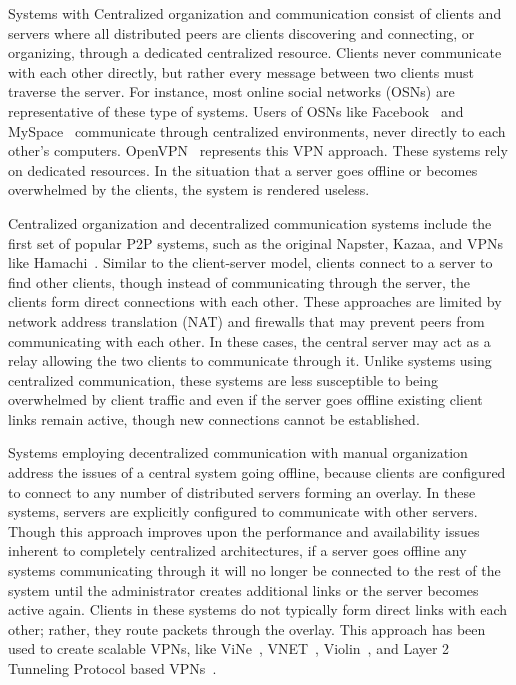 Systems with Centralized organization and communication consist of clients and
servers where all distributed peers are clients discovering and connecting, or
organizing, through a dedicated centralized resource. Clients never communicate
with each other directly, but rather every message between two clients must
traverse the server.  For instance, most online social networks (OSNs) are
representative of these type of systems.  Users of OSNs like
Facebook~\cite{facebook} and MySpace~\cite{myspace} communicate through
centralized environments, never directly to each other's computers.
OpenVPN~\cite{openvpn} represents this VPN approach.  These systems rely on
dedicated resources.  In the situation that a server goes offline or becomes
overwhelmed by the clients, the system is rendered useless.

Centralized organization and decentralized communication systems include the
first set of popular P2P systems, such as the original Napster, Kazaa, and VPNs
like Hamachi~\cite{hamachi}.  Similar to the client-server model, clients
connect to a server to find other clients, though instead of communicating
through the server, the clients form direct connections with each other.  These
approaches are limited by network address translation (NAT) and firewalls that
may prevent peers from communicating with each other.  In these cases, the
central server may act as a relay allowing the two clients to communicate
through it.  Unlike systems using centralized communication, these systems are
less susceptible to being overwhelmed by client traffic and even if the server
goes offline existing client links remain active, though new connections cannot
be established.

Systems employing decentralized communication with manual organization address
the issues of a central system going offline, because clients are configured to
connect to any number of distributed servers forming an overlay.  In these
systems, servers are explicitly configured to communicate with other servers.
Though this approach improves upon the performance and availability issues
inherent to completely centralized architectures, if a server goes offline any
systems communicating through it will no longer be connected to the rest of the
system until the administrator creates additional links or the server becomes
active again.  Clients in these systems do not typically form direct links with
each other; rather, they route packets through the overlay.  This approach has
been used to create scalable VPNs, like ViNe~\cite{vine}, VNET~\cite{vnet},
Violin~\cite{violin}, and Layer 2 Tunneling Protocol based VPNs~\cite{l2tp}.

